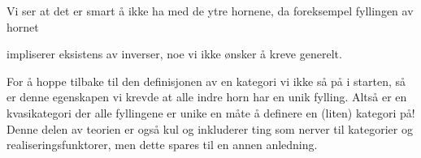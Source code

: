 Vi ser at det er smart å ikke ha med de ytre hornene, da foreksempel fyllingen av hornet 
\begin{center}
\end{center}
impliserer eksistens av inverser, noe vi ikke ønsker å kreve generelt. 

For å hoppe tilbake til den definisjonen av en kategori vi ikke så på i starten, så er denne egenskapen vi krevde at alle indre horn har en unik fylling. 
Altså er en kvasikategori der alle fyllingene er unike en måte å definere en (liten) kategori på! 
Denne delen av teorien er også kul og inkluderer ting som nerver til kategorier og realiseringsfunktorer, men dette spares til en annen anledning.